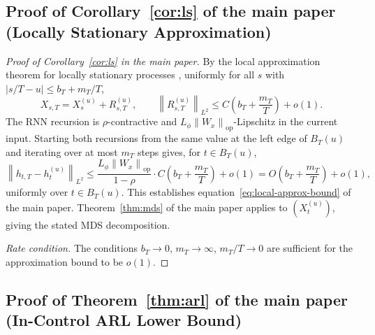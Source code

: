 \documentclass[bj,authoryear]{imsart}
\theoremstyle{plain}
\theoremstyle{definition}
\newcommand{\norm}[1]{\left\lVert #1 \right\rVert}
\begin{document}
\subsection{Proof of Corollary~\ref{cor:ls} of the main paper (Locally Stationary Approximation)}
\label{app:proof-corls}

\begin{proof}[Proof of Corollary~\ref{cor:ls} in the main paper]
  By the local approximation theorem for locally stationary processes
  \citep{dahlhaus1997fitting}, uniformly for all $s$ with $|s/T - u| \leq b_T + m_T/T$,
  \[
    X_{s,T} = X_s^{(u)} + R_{s,T}^{(u)},
    \qquad
    \norm{R_{s,T}^{(u)}}_{L^2} \leq C\!\left(b_T + \frac{m_T}{T}\right) + o(1).
  \]
  The RNN recursion is $\rho$-contractive and $L_\phi\norm{W_x}_{\mathrm{op}}$-Lipschitz
  in the current input.  Starting both recursions from the same value at the left
  edge of $B_T(u)$ and iterating over at most $m_T$ steps gives, for $t \in B_T(u)$,
  \[
    \norm{h_{t,T} - h_t^{(u)}}_{L^2}
    \leq \frac{L_\phi\norm{W_x}_{\mathrm{op}}}{1-\rho}
         \cdot C\!\left(b_T + \frac{m_T}{T}\right) + o(1)
    = O\!\left(b_T + \frac{m_T}{T}\right) + o(1),
  \]
  uniformly over $t \in B_T(u)$.  This establishes equation~\eqref{eq:local-approx-bound} of the main paper.
  Theorem~\ref{thm:mds} of the main paper applies to $(X_t^{(u)})$, giving the
  stated MDS decomposition.

  \textit{Rate condition.}
  The conditions $b_T\to 0$, $m_T\to\infty$, $m_T/T\to 0$ are sufficient
  for the approximation bound to be $o(1)$.
\end{proof}

\subsection{Proof of Theorem~\ref{thm:arl} of the main paper (In-Control ARL Lower Bound)}
\label{app:proof-thmarl}
\end{document}
